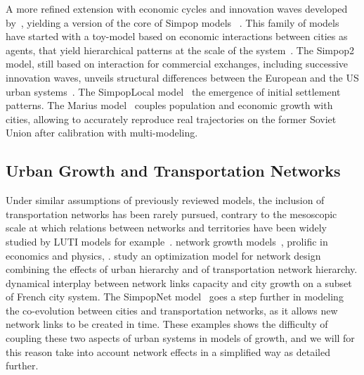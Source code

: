 \documentclass[Royal,sageh,times]{sagej}
\begin{document}
A more refined extension with economic cycles and innovation waves  developed by~\cite{favaro2011gibrat}, yielding a version of the core of Simpop models~\citep{pumain2012multi} . This family of models have started with a toy-model based on economic interactions between cities as agents, that yield hierarchical patterns at the scale of the system~\citep{sanders1997simpop}. The Simpop2 model, still based on  interaction for commercial exchanges, including successive innovation waves, unveils structural differences between the European and the US urban systems~\citep{bretagnolle2010comparer}. The SimpopLocal model~\citep{pumain2017simpoplocal}  the emergence of initial settlement patterns. The Marius model~\citep{cottineau2014evolution} couples population and economic growth with  cities, allowing to accurately reproduce real trajectories on the former Soviet Union after calibration with  multi-modeling.




\subsection*{Urban Growth and Transportation Networks}


Under similar assumptions of previously reviewed models, the inclusion of transportation networks has been rarely pursued, contrary to the mesoscopic scale at which relations between networks and territories have been widely studied by LUTI models for example~\citep{chang2006models}.  network growth models~\citep{xie2009modeling}, prolific in economics and physics, . \cite{bigotte2010integrated} study an optimization model for network design combining the effects of urban hierarchy and of transportation network hierarchy. \cite{baptiste1999interactions}  dynamical interplay between network links capacity and city growth on a subset of  French city system. The SimpopNet model~\citep{schmitt2014modelisation} goes a step further in modeling the co-evolution between cities and transportation networks, as it allows new network links to be created in time. These examples shows the difficulty of coupling these two aspects of urban systems in models of growth, and we will for this reason take into account network effects in a simplified way as detailed further.
\end{document}
